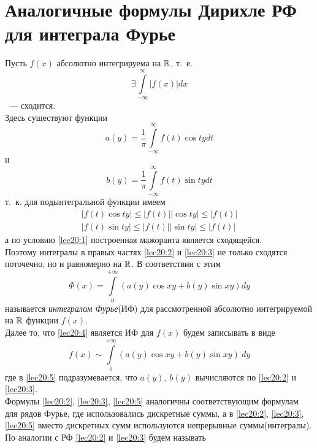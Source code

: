 \documentclass[../../main.tex]{subfiles}
\begin{document}
\section{Аналогичные формулы Дирихле РФ для интеграла Фурье}

Пусть $ f(x) $ абсолютно интегрируема на $ \mathbb{R} $, т.~е.
\begin{equation}
\label{lec20:1}
\exists \int\limits_{-\infty}^\infty |f(x)| dx
\end{equation}
~--- сходится.\\
Здесь существуют функции
\begin{equation}
\label{lec20:2}
a(y) = \dfrac{1}{\pi} \int\limits_{-\infty}^\infty 
f(t) \cos ty dt
\end{equation}
и
\begin{equation}
\label{lec20:3}
b(y) = \dfrac{1}{\pi} \int\limits_{-\infty}^\infty
f(t) \sin ty dt
\end{equation}
т.~к. для подынтегральной функции имеем
\[
\begin{gathered}
|f(t) \cos ty| \leq |f(t)||\cos ty| \leq |f(t)|\\
|f(t) \sin ty| \leq |f(t)||\sin ty| \leq |f(t)|
\end{gathered}
\]
а по условию \eqref{lec20:1} построенная мажоранта является сходящейся.\\
Поэтому интегралы в правых частях \eqref{lec20:2} и \eqref{lec20:3}
не только сходятся поточечно, но и равномерно на $ \mathbb{R} $.
В соответствии с этим 
\begin{equation}
\label{lec20:4}
\Phi(x) = \int\limits_0^{+\infty} \left(
a(y) \cos xy + b(y) \sin xy
\right) dy
\end{equation}
называется \emph{интегралом Фурье}(ИФ) для рассмотренной
абсолютно интегрируемой на $ \mathbb{R} $ функции $ f(x) $.\\
Далее то, что \eqref{lec20:4} является ИФ для $ f(x) $ будем записывать в виде
\begin{equation}
\label{lec20:5}
f(x) \sim \int\limits_0^{+\infty} \left(
a(y) \cos xy + b(y) \sin xy
\right) \ dy
\end{equation}
где в \eqref{lec20:5} подразумевается, что $ a(y),\ b(y) $ вычисляются по 
\eqref{lec20:2} и \eqref{lec20:3}.\\
Формулы \eqref{lec20:2}, \eqref{lec20:3}, \eqref{lec20:5} аналогичны
соответствующим формулам для рядов Фурье, где 
использовались дискретные суммы, а в 
\eqref{lec20:2}, \eqref{lec20:3}, \eqref{lec20:5}
вместо дискретных сумм используются непрерывные суммы(интегралы).
По аналогии с РФ \eqref{lec20:2} и \eqref{lec20:3} будем называть 
\end{document}
